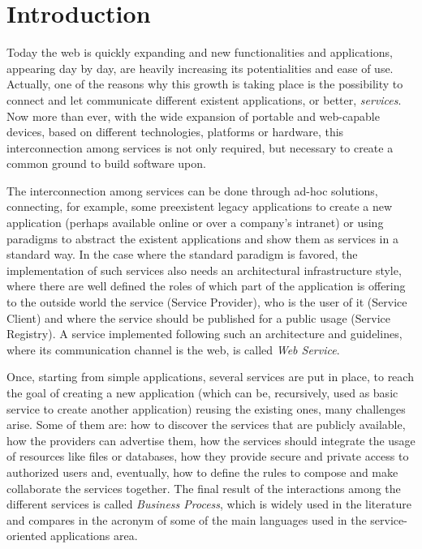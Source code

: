 \section{Introduction}

Today the web is quickly expanding and new functionalities and applications, appearing day by day, are heavily increasing its potentialities and ease of use. Actually, one of the reasons why this growth is taking place is the possibility to connect and let communicate different existent applications, or better, \textit{services}. Now more than ever, with the wide expansion of portable and web-capable devices, based on different technologies, platforms or hardware, this interconnection among services is not only required, but necessary to create a common ground to build software upon.

The interconnection among services can be done through ad-hoc solutions, connecting, for example, some preexistent legacy applications to create a new application (perhaps available online or over a company's intranet) or using paradigms to abstract the existent applications and show them as services in a standard way. %
In the case where the standard paradigm is favored, the implementation of such services also needs an architectural infrastructure style, where there are well defined the roles of which part of the application is offering to the outside world the service (Service Provider), who is the user of it (Service Client) and where the service should be published for a public usage (Service Registry). %
A service implemented following such an architecture and guidelines, where its communication channel is the web, is called \textit{Web Service}. %

Once, starting from simple applications, several services are put in place, to reach the goal of creating a new application (which can be, recursively, used as basic service to create another application) reusing the existing ones, many challenges arise. Some of them are: how to discover the services that are publicly available, how the providers can advertise them, how the services should integrate the usage of resources like files or databases, how they provide secure and private access to authorized users and, eventually, how to define the rules to compose and make collaborate the services together. 
The final result of the interactions among the different services is called \textit{Business Process}, which is widely used in the literature and compares in the acronym of some of the main languages used in the service-oriented applications area.

